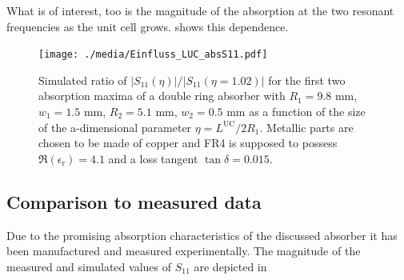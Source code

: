 What is of interest, too is the magnitude of the absorption at the two resonant frequencies as the unit cell grows.  shows this dependence.

\begin{figure}
\centering
\texttt{[image: ./media/Einfluss\_LUC\_absS11.pdf]}
\caption{Simulated ratio of $|S_{11}(\eta)|/|S_{11}(\eta=1.02)|$ for the first two absorption maxima of a double ring absorber with $R_1=9.8$ mm, $w_1=1.5$ mm, $R_2=5.1$ mm, $w_2=0.5$ mm as a function of the size of the a-dimensional parameter $\eta = L^\mathrm{UC}/2R_1$. Metallic parts are chosen to be made of copper and FR4 is supposed to possess $\Re\left(\epsilon_\mathrm{r}\right)=4.1$ and a loss tangent $\tan\delta = 0.015$.}
\label{fig:LUC_absS11}
\end{figure}


\subsection{Comparison to measured data}
Due to the promising absorption characteristics of the discussed absorber it has been manufactured and measured experimentally. The magnitude of the measured and simulated values of $S_{11}$ are depicted in 